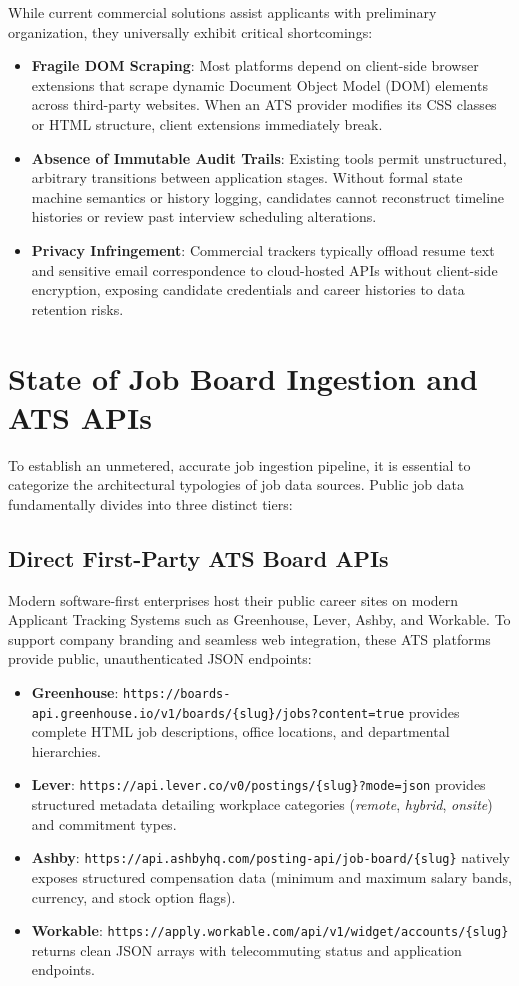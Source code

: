 While current commercial solutions assist applicants with preliminary organization, they universally exhibit critical shortcomings:
\begin{itemize}
    \item \textbf{Fragile DOM Scraping}: Most platforms depend on client-side browser extensions that scrape dynamic Document Object Model (DOM) elements across third-party websites. When an ATS provider modifies its CSS classes or HTML structure, client extensions immediately break.
    \item \textbf{Absence of Immutable Audit Trails}: Existing tools permit unstructured, arbitrary transitions between application stages. Without formal state machine semantics or history logging, candidates cannot reconstruct timeline histories or review past interview scheduling alterations.
    \item \textbf{Privacy Infringement}: Commercial trackers typically offload resume text and sensitive email correspondence to cloud-hosted APIs without client-side encryption, exposing candidate credentials and career histories to data retention risks.
\end{itemize}

\section{State of Job Board Ingestion and ATS APIs}
To establish an unmetered, accurate job ingestion pipeline, it is essential to categorize the architectural typologies of job data sources. Public job data fundamentally divides into three distinct tiers:

\subsection{Direct First-Party ATS Board APIs}
Modern software-first enterprises host their public career sites on modern Applicant Tracking Systems such as Greenhouse, Lever, Ashby, and Workable. To support company branding and seamless web integration, these ATS platforms provide public, unauthenticated JSON endpoints:
\begin{itemize}
    \item \textbf{Greenhouse}: \texttt{https://boards-api.greenhouse.io/v1/boards/\{slug\}/jobs?content=true} provides complete HTML job descriptions, office locations, and departmental hierarchies.
    \item \textbf{Lever}: \texttt{https://api.lever.co/v0/postings/\{slug\}?mode=json} provides structured metadata detailing workplace categories (\textit{remote}, \textit{hybrid}, \textit{onsite}) and commitment types.
    \item \textbf{Ashby}: \texttt{https://api.ashbyhq.com/posting-api/job-board/\{slug\}} natively exposes structured compensation data (minimum and maximum salary bands, currency, and stock option flags).
    \item \textbf{Workable}: \texttt{https://apply.workable.com/api/v1/widget/accounts/\{slug\}} returns clean JSON arrays with telecommuting status and application endpoints.
\end{itemize}

